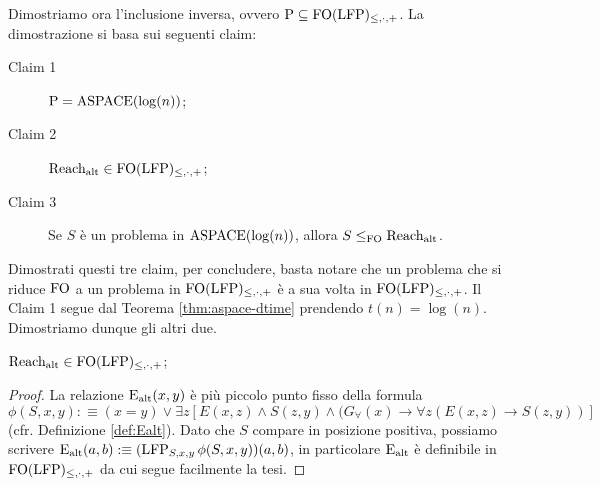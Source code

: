 Dimostriamo ora l'inclusione inversa, ovvero $\operatorname{P} \subseteq \operatorname{FO}(\operatorname{LFP})_{\leq,\cdot,+}$. La
dimostrazione si basa sui seguenti claim:
\begin{description}
 \item[Claim 1]\label{p_eq_a} $\operatorname{P} = \operatorname{ASPACE}(\log(n))$;
 \item[Claim 2]\label{ralt_in_p} $\operatorname{Reach_{alt}} \in \operatorname{FO}(\operatorname{LFP})_{\leq,\cdot,+}$;
 \item[Claim 3]\label{reduct_fo} Se $S$ è un problema in $\operatorname{ASPACE}(\log(n))$, allora $S \leq_{\operatorname{FO}} \operatorname{Reach_{alt}}$.
\end{description}
Dimostrati questi tre claim, per concludere, basta notare che un problema che si
riduce $\operatorname{FO}$ a un problema in $\operatorname{FO}(\operatorname{LFP})_{\leq,\cdot,+}$ è a sua volta in $\operatorname{FO}(\operatorname{LFP})_{\leq,\cdot,+}$.
Il Claim 1 segue dal Teorema \ref{thm:aspace-dtime} prendendo $t(n) = \log(n)$.
Dimostriamo dunque gli altri due.
\begin{proposizione}
\label{prop:ralt-in-fo(lfp)}
  $\operatorname{Reach_{alt}} \in \operatorname{FO}(\operatorname{LFP})_{\leq,\cdot,+}$;
\end{proposizione}
\begin{proof}
 La relazione $\operatorname{E_{alt}}(x,y)$ è più piccolo punto fisso della formula
 \[ \phi(S,x,y) :\equiv (x=y) \lor \exists z 
  \left[ E(x,z) \land S(z,y) \land (G_\forall(x) \rightarrow \forall z\left(E(x,z) \rightarrow S(z,y)\right)\right]
 \]
 (cfr. Definizione \ref{def:Ealt}). Dato che $S$ compare in posizione positiva,
 possiamo scrivere $\operatorname{E_{alt}}(a,b) :\equiv (\operatorname{LFP}_{S,x,y} \phi(S,x,y))(a,b)$,
 in particolare $\operatorname{E_{alt}}$ è definibile in $\operatorname{FO}(\operatorname{LFP})_{\leq,\cdot,+}$ da cui segue facilmente
 la tesi.
\end{proof}

